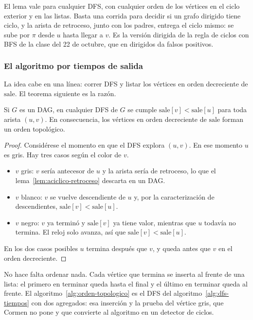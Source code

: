 \documentclass[11pt,letterpaper]{article}
\begin{document}
El lema vale para cualquier DFS, con cualquier orden de los vértices en
el ciclo exterior y en las listas. Basta una corrida para decidir si un
grafo dirigido tiene ciclo, y la arista de retroceso, junto con los
padres, entrega el ciclo mismo: se sube por $\pi$ desde $u$ hasta
llegar a $v$. Es la versión dirigida de la regla de ciclos con BFS de
la clase del 22 de octubre, que en dirigidos da falsos positivos.

\subsubsection*{El algoritmo por tiempos de salida}

La idea cabe en una línea: correr DFS y listar los vértices en orden
decreciente de $\text{sale}$. El teorema siguiente es la razón.

\begin{teorema}
  \label{teo:topologico-salida}
  Si $G$ es un DAG, en cualquier DFS de $G$ se cumple
  $\text{sale}[v] < \text{sale}[u]$ para toda arista $(u, v)$. En
  consecuencia, los vértices en orden decreciente de $\text{sale}$
  forman un orden topológico.
\end{teorema}

\begin{proof}
  Considérese el momento en que el DFS explora $(u, v)$. En ese momento
  $u$ es gris. Hay tres casos según el color de $v$.
  \begin{itemize}[itemsep=0.1em]
    \item $v$ gris: $v$ sería antecesor de $u$ y la arista sería de
          retroceso, lo que el lema~\ref{lem:aciclico-retroceso}
          descarta en un DAG.
    \item $v$ blanco: $v$ se vuelve descendiente de $u$ y, por la
          caracterización de descendientes,
          $\text{sale}[v] < \text{sale}[u]$.
    \item $v$ negro: $v$ ya terminó y $\text{sale}[v]$ ya tiene valor,
          mientras que $u$ todavía no termina. El reloj solo avanza,
          así que $\text{sale}[v] < \text{sale}[u]$.
  \end{itemize}
  En los dos casos posibles $u$ termina después que $v$, y queda antes
  que $v$ en el orden decreciente.
\end{proof}

No hace falta ordenar nada. Cada vértice que termina se inserta al
frente de una lista: el primero en terminar queda hasta el final y el
último en terminar queda al frente. El
algoritmo~\ref{alg:orden-topologico} es el DFS del
algoritmo~\ref{alg:dfs-tiempos} con dos agregados: esa inserción y la
prueba del vértice gris, que Cormen no pone y que convierte al
algoritmo en un detector de ciclos.
\end{document}

